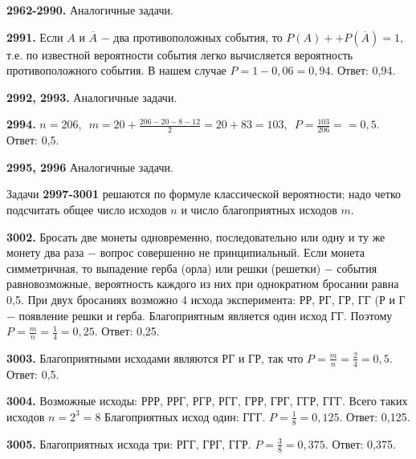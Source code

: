 \textbf{2962-2990.} Аналогичные задачи.

\textbf{2991.} Если $A$ и $\overline{A}$ $-$ два противоположных события, то $P(A)+$\newline$+P(\overline{A})=1,$ т.е. по известной вероятности события легко вычисляется вероятность противоположного события. В нашем случае $P = 1 - 0,06 = 0,94.$ \null \hspace*{\fill} Ответ: 0,94. 

\textbf{2992, 2993.} Аналогичные задачи.

\textbf{2994.} $n=206,\enspace m=20+\frac{206-20-8-12}{2}=20+83=103,\enspace P=\frac{103}{206}=$\newline$=0,5.$ \newline \null \hspace*{\fill} Ответ: 0,5. 

\textbf{2995, 2996} Аналогичные задачи.

Задачи \textbf{2997-3001} решаются по формуле классической вероятности; надо четко подсчитать общее число исходов $n$ и число благоприятных исходов $m$.

\textbf{3002.} Бросать две монеты одновременно, последовательно или одну и ту же монету два раза $-$ вопрос совершенно не принципиальный. Если монета симметричная, то выпадение герба (орла) или решки (решетки) $-$ события равновозможные, вероятность каждого из них при однократном бросании равна 0,5. При двух бросаниях возможно 4 исхода эксперимента: РР, РГ, ГР, ГГ (Р и Г $-$  появление решки и герба. Благоприятным является один исход ГГ. Поэтому $P = \frac{m}{n}=\frac{1}{4}=0,25.$ \newline \null \hspace*{\fill} Ответ: 0,25. 

\textbf{3003.} Благоприятными исходами являются РГ и ГР, так что $P = \frac{m}{n} =\frac{2}{4} = 0,5.$ \newline \null \hspace*{\fill} Ответ: 0,5. 

\textbf{3004.} Возможные исходы: РРР, РРГ, РГР, РГГ, ГРР, ГРГ, ГГР, ГГГ. Всего таких исходов $n=2^3=8$ Благоприятных исход один: ГГГ. $P = \frac{1}{8} = 0,125.$ \newline \null \hspace*{\fill} Ответ: 0,125. 

\textbf{3005.} Благоприятных исхода три: РГГ, ГРГ, ГГР. $P=\frac{3}{8}=0,375.$ \newline \null \hspace*{\fill} Ответ: 0,375. 

